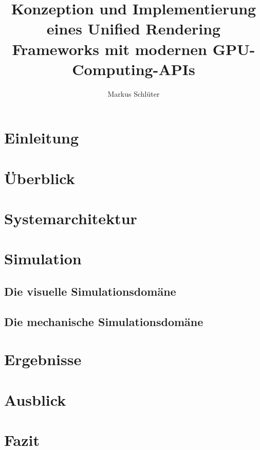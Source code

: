 \documentclass[m,intern,palatino]{cgBA}
\begin{document}
\author{Markus Schl{\"u}ter}
\title{Konzeption und Implementierung eines Unified Rendering Frameworks mit modernen GPU-Computing-APIs}








\maketitle
\clearpage 




\listoftodos		%
\tableofcontents
\clearpage         	%




\section{Einleitung}
	
	
\section{Überblick}
	

\section{Systemarchitektur}
	
	
\section{Simulation}
	\subsection{Die visuelle Simulationsdomäne}
			
	\subsection{Die mechanische Simulationsdomäne}
		


\section{Ergebnisse}

	

\section{Ausblick}

	

\section{Fazit}

	



\end{document}
